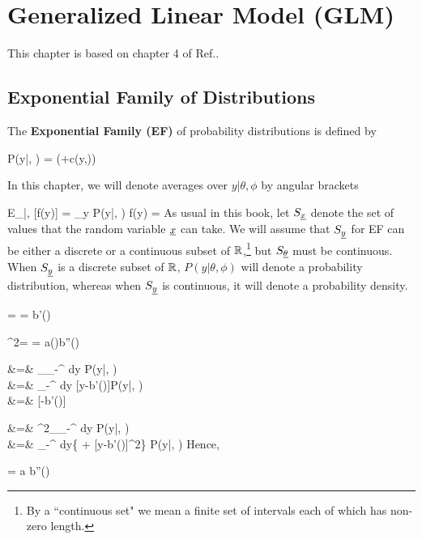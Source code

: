\chapter{Generalized Linear Model (GLM)}
\label{ch-gen-lin-mod}

This chapter is based on
chapter 4 of Ref.\cite{agresti-book}.

\section{Exponential Family of Distributions}
\label{sec-exp-fam}

The {\bf Exponential Family (EF)} of probability distributions is defined by

\beq
P(y|\theta, \phi) =
\exp\left(+c(y,\phi)\right)
\eeq

In this chapter, we will
denote averages over $y|\theta, \phi$ by angular brackets

\beq
E_{\rvy|\theta, \phi}[f(y)] = \sum_y P(y|\theta, \phi) f(y) = 
\eeq
As usual in this book, let $S_{\underline{x}}$ denote the set of
values that the random variable ${\underline{x}}$ can take.
We will assume that $S_{\underline{y}}$
for EF
can be either a discrete or a continuous
subset of ${ \mathbb{R}}$,\footnote{By a ``continuous set" we
mean a finite set of intervals
 each of which has non-zero length.}
but $S_{\underline{\theta}}$
must be continuous.
When $S_{\underline{y}}$ is a discrete subset of ${ \mathbb{R}}$, $P(y|\theta, \phi)$
will denote a probability distribution, whereas when
$S_{\underline{y}}$ is continuous, it will denote
a probability density.

\begin{claim}
\beq
\mu = \av{\rvy} = b'(\theta)
\eeq

\beq
\s^2= \av{\rvy, \rvy} = a(\phi)b''(\theta)
\eeq
\end{claim}
\proof

&=& \partial_\theta \int_{-\infty}^\infty
dy\; P(y|\theta, \phi)
\\
&=&
\int_{-\infty}^\infty
dy\;
[y-b'(\theta)]P(y|\theta, \phi)
\\
&=&
[\av{\rvy}-b'(\theta)]
\eeqa

&=& \partial^2_\theta \int_{-\infty}^\infty
dy\; P(y|\theta, \phi)
\\
&=&
\int_{-\infty}^\infty
dy\;\left\{ +
[y-b'(\theta)]^2\right\}
P(y|\theta, \phi)
\eeqa
Hence,

\beq
{}= a b''(\theta)
\eeq

